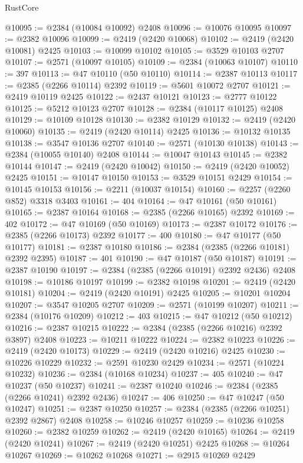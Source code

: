 \begin{lexlean}{RustCore}
\begin{coremodule}
@10095 := @2384 (@10084 @10092) @2408
@10096 := @10076 @10095
@10097 := @2382 @10096
@10099 := @2419 (@2420 @10068)
@10102 := @2419 (@2420 @10081) @2425
@10103 := @10099 @10102
@10105 := @3529 @10103 @2707
@10107 := @2571 (@10097 @10105)
@10109 := @2384 (@10063 @10107)
@10110 := 397
@10113 := @47 @10110 (@50 @10110)
@10114 := @2387 @10113
@10117 := @2385 (@2266 @10114) @2392
@10119 := @5601 @10072 @2707
@10121 := @2419 @10119 @2425
@10122 := @2437 @10121
@10123 := @2777 @10122
@10125 := @5212 @10123 @2707
@10128 := @2384 (@10117 @10125) @2408
@10129 := @10109 @10128
@10130 := @2382 @10129
@10132 := @2419 (@2420 @10060)
@10135 := @2419 (@2420 @10114) @2425
@10136 := @10132 @10135
@10138 := @3547 @10136 @2707
@10140 := @2571 (@10130 @10138)
@10143 := @2384 (@10055 @10140) @2408
@10144 := @10047 @10143
@10145 := @2382 @10144
@10147 := @2419 (@2420 @10042)
@10150 := @2419 (@2420 @10052) @2425
@10151 := @10147 @10150
@10153 := @3529 @10151 @2429
@10154 := @10145 @10153
@10156 := @2211 (@10037 @10154)
@10160 := @2257 (@2260 @852) @3318 @3403
@10161 := 404
@10164 := @47 @10161 (@50 @10161)
@10165 := @2387 @10164
@10168 := @2385 (@2266 @10165) @2392
@10169 := 402
@10172 := @47 @10169 (@50 @10169)
@10173 := @2387 @10172
@10176 := @2385 (@2266 @10173) @2392
@10177 := 400
@10180 := @47 @10177 (@50 @10177)
@10181 := @2387 @10180
@10186 := @2384 (@2385 (@2266 @10181) @2392 @2395)
@10187 := 401
@10190 := @47 @10187 (@50 @10187)
@10191 := @2387 @10190
@10197 := @2384 (@2385 (@2266 @10191) @2392 @2436) @2408
@10198 := @10186 @10197
@10199 := @2382 @10198
@10201 := @2419 (@2420 @10181)
@10204 := @2419 (@2420 @10191) @2425
@10205 := @10201 @10204
@10207 := @3547 @10205 @2707
@10209 := @2571 (@10199 @10207)
@10211 := @2384 (@10176 @10209)
@10212 := 403
@10215 := @47 @10212 (@50 @10212)
@10216 := @2387 @10215
@10222 := @2384 (@2385 (@2266 @10216) @2392 @3897) @2408
@10223 := @10211 @10222
@10224 := @2382 @10223
@10226 := @2419 (@2420 @10173)
@10229 := @2419 (@2420 @10216) @2425
@10230 := @10226 @10229
@10232 := @2591 @10230 @2429
@10234 := @2571 (@10224 @10232)
@10236 := @2384 (@10168 @10234)
@10237 := 405
@10240 := @47 @10237 (@50 @10237)
@10241 := @2387 @10240
@10246 := @2384 (@2385 (@2266 @10241) @2392 @2436)
@10247 := 406
@10250 := @47 @10247 (@50 @10247)
@10251 := @2387 @10250
@10257 := @2384 (@2385 (@2266 @10251) @2392 @2867) @2408
@10258 := @10246 @10257
@10259 := @10236 @10258
@10260 := @2382 @10259
@10262 := @2419 (@2420 @10165)
@10264 := @2419 (@2420 @10241)
@10267 := @2419 (@2420 @10251) @2425
@10268 := @10264 @10267
@10269 := @10262 @10268
@10271 := @2915 @10269 @2429

\end{coremodule}
\end{lexlean}
